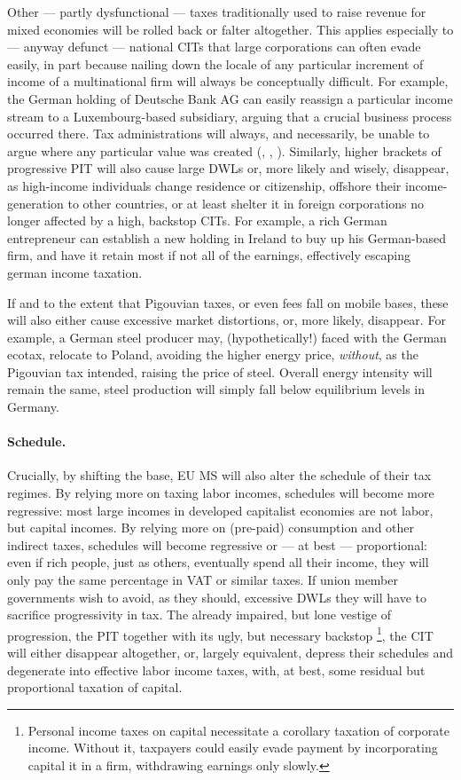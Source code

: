 \documentclass[11pt,a4paper,oneside,openright]{article}
\begin{document}
Other --- partly dysfunctional --- taxes traditionally used to raise revenue for mixed economies will be rolled back or falter altogether. 
This applies especially to --- anyway defunct --- national \glspl{CIT} that large corporations can often evade easily, in part because nailing down the locale of any particular increment of income of a multinational firm will always be conceptually difficult. 
For example, the German holding of Deutsche Bank AG can easily reassign a particular income stream to a Luxembourg-based subsidiary, arguing that a crucial business process occurred there. 
Tax administrations will always, and necessarily, be unable to argue where any particular value was created (\citealt{Ganghof2006}, \citealt{Ganghof}, \citealt[5]{Ganghof2007}). 
Similarly, higher brackets of progressive \gls{PIT} will also cause large \glspl{DWL} or, more likely and wisely, disappear, as high-income individuals change residence or citizenship, offshore their income-generation to other countries, or at least shelter it in foreign corporations no longer affected by a high, backstop \glspl{CIT}. 
For example, a rich German entrepreneur can establish a new holding in Ireland to buy up his German-based firm, and have it retain most if not all of the earnings, effectively escaping german income taxation. 

If and to the extent that Pigouvian taxes, or even fees fall on mobile bases, these will also either cause excessive market distortions, or, more likely, disappear. 
For example, a German steel producer may, (hypothetically!) faced with the German ecotax, relocate to Poland, avoiding the higher energy price, \emph{without}, as the Pigouvian tax intended, raising the price of steel. 
Overall energy intensity will remain the same, steel production will simply fall below equilibrium levels in Germany.

\paragraph{Schedule.} Crucially, by shifting the base, \gls{EU} \gls{MS} will also alter the schedule of their tax regimes. 
By relying more on taxing labor incomes, schedules will become more regressive: 
most large incomes in developed capitalist economies are not labor, but capital incomes. 
By relying more on (pre-paid) consumption and other indirect taxes, schedules will become regressive or --- at best --- proportional: 
even if rich people, just as others, eventually spend all their income, they will only pay the same percentage in \gls{VAT} or similar taxes. 
If union member governments wish to avoid, as they should, excessive \glspl{DWL} they will have to sacrifice progressivity in tax. 
The already impaired, but lone vestige of progression, the \gls{PIT} together with its ugly, but necessary backstop
\footnote{
	Personal income taxes on capital necessitate a corollary taxation of corporate income. 
	Without it, taxpayers could easily evade payment by incorporating capital it in a firm, withdrawing earnings only slowly.
}, 
the \gls{CIT} will either disappear altogether, or, largely equivalent, depress their schedules and degenerate into effective labor income taxes, with, at best, some residual but proportional taxation of capital.
\end{document}

